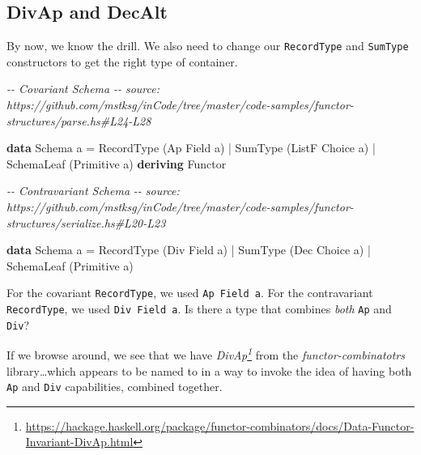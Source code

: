 \documentclass[]{article}
\newenvironment{Shaded}{}{}
\newcommand{\CommentTok}[1]{\textcolor[rgb]{0.38,0.63,0.69}{\textit{#1}}}
\newcommand{\DataTypeTok}[1]{\textcolor[rgb]{0.56,0.13,0.00}{#1}}
\newcommand{\KeywordTok}[1]{\textcolor[rgb]{0.00,0.44,0.13}{\textbf{#1}}}
\newcommand{\NormalTok}[1]{#1}
\newcommand{\OperatorTok}[1]{\textcolor[rgb]{0.40,0.40,0.40}{#1}}
\newcommand{\OtherTok}[1]{\textcolor[rgb]{0.00,0.44,0.13}{#1}}
\renewcommand{\href}[2]{#2\footnote{\url{#1}}}
\begin{document}
\hypertarget{divap-and-decalt}{%
\subsection{DivAp and DecAlt}\label{divap-and-decalt}}

By now, we know the drill. We also need to change our \texttt{RecordType} and
\texttt{SumType} constructors to get the right type of container.

\begin{Shaded}
\begin{Highlighting}[]
\CommentTok{{-}{-} Covariant Schema}
\CommentTok{{-}{-} source: https://github.com/mstksg/inCode/tree/master/code{-}samples/functor{-}structures/parse.hs\#L24{-}L28}

\KeywordTok{data} \DataTypeTok{Schema}\NormalTok{ a }\OtherTok{=}
      \DataTypeTok{RecordType}\NormalTok{  (}\DataTypeTok{Ap}    \DataTypeTok{Field}\NormalTok{  a)}
    \OperatorTok{|} \DataTypeTok{SumType}\NormalTok{     (}\DataTypeTok{ListF} \DataTypeTok{Choice}\NormalTok{ a)}
    \OperatorTok{|} \DataTypeTok{SchemaLeaf}\NormalTok{  (}\DataTypeTok{Primitive}\NormalTok{ a)}
  \KeywordTok{deriving} \DataTypeTok{Functor}
\end{Highlighting}
\end{Shaded}

\begin{Shaded}
\begin{Highlighting}[]
\CommentTok{{-}{-} Contravariant Schema}
\CommentTok{{-}{-} source: https://github.com/mstksg/inCode/tree/master/code{-}samples/functor{-}structures/serialize.hs\#L20{-}L23}

\KeywordTok{data} \DataTypeTok{Schema}\NormalTok{ a }\OtherTok{=}
      \DataTypeTok{RecordType}\NormalTok{  (}\DataTypeTok{Div} \DataTypeTok{Field}\NormalTok{  a)}
    \OperatorTok{|} \DataTypeTok{SumType}\NormalTok{     (}\DataTypeTok{Dec} \DataTypeTok{Choice}\NormalTok{ a)}
    \OperatorTok{|} \DataTypeTok{SchemaLeaf}\NormalTok{  (}\DataTypeTok{Primitive}\NormalTok{ a)}
\end{Highlighting}
\end{Shaded}

For the covariant \texttt{RecordType}, we used \texttt{Ap\ Field\ a}. For the
contravariant \texttt{RecordType}, we used \texttt{Div\ Field\ a}. Is there a
type that combines \emph{both} \texttt{Ap} and \texttt{Div}?

If we browse around, we see that we have
\emph{\href{https://hackage.haskell.org/package/functor-combinators/docs/Data-Functor-Invariant-DivAp.html}{DivAp}}
from the \emph{functor-combinatotrs} library\ldots which appears to be named to
in a way to invoke the idea of having both \texttt{Ap} and \texttt{Div}
capabilities, combined together.
\end{document}
